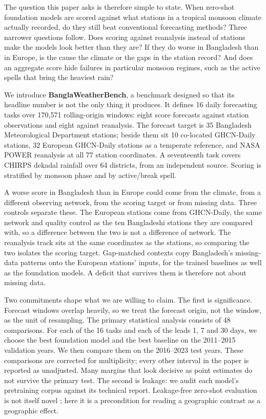 The question this paper asks is therefore simple to state. When zero-shot foundation models are scored against
what stations in a tropical monsoon climate actually recorded, do they still beat conventional forecasting
methods? Three narrower questions follow. Does scoring against reanalysis instead of stations make the models look
better than they are? If they do worse in Bangladesh than in Europe, is the cause the climate or the gaps in the
station record? And does an aggregate score hide failures in particular monsoon regimes, such as the active spells
that bring the heaviest rain?

We introduce \textbf{BanglaWeatherBench}, a benchmark designed so that its headline number is not the only thing it
produces. It defines 16 daily forecasting tasks over 170{,}571 rolling-origin windows: eight score forecasts against
station observations and eight against reanalysis. The
forecast target is 35 Bangladesh Meteorological Department stations; beside them sit 10 co-located GHCN-Daily
stations, 32 European GHCN-Daily stations as a temperate reference, and NASA POWER reanalysis at all 77 station
coordinates. A seventeenth task covers CHIRPS dekadal rainfall over 64 districts, from an independent source.
Scoring is stratified by monsoon phase and by active/break spell.

A worse score in Bangladesh than in Europe could come from the climate, from a different observing network, from
the scoring target or from missing data. Three controls separate these. The European stations come from
GHCN-Daily, the same network and quality control as the ten Bangladeshi stations they are compared with, so a
difference between the two is not a difference of network. The reanalysis track sits at the same coordinates as
the stations, so comparing the two isolates the scoring target. Gap-matched contexts copy Bangladesh's
missing-data patterns onto the European stations' inputs, for the trained baselines as well as the foundation
models. A deficit that survives them is therefore not about missing data.

Two commitments shape what we are willing to claim. The first is significance. Forecast windows overlap heavily,
so we treat the forecast origin, not the window, as the unit of resampling. The primary statistical analysis
consists of 48 comparisons. For each of the 16 tasks and each of the leads 1, 7 and 30 days, we choose the best
foundation model and the best baseline on the 2011--2015 validation years. We then compare them on the
2016--2023 test years. These comparisons are corrected for multiplicity; every other interval in the paper is reported as unadjusted.
Many margins that look decisive as point estimates do not survive the primary test. The second is leakage: we audit each model's
pretraining corpus against its technical report. Leakage-free zero-shot evaluation is not itself novel
\citep{qiao2026time}; here it is a precondition for reading a geographic contrast as a geographic effect.

